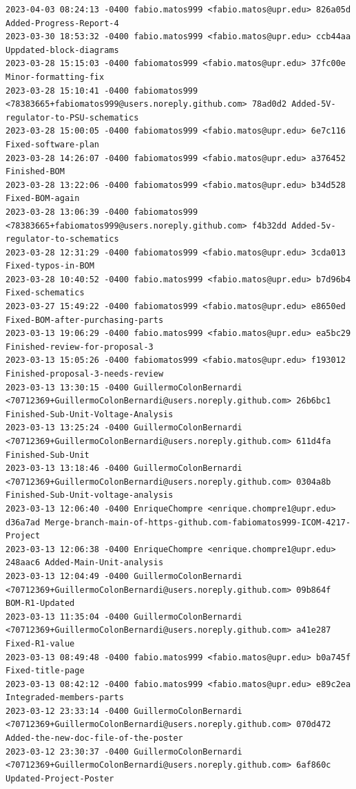\documentclass[12pt]{article}
\begin{document}
\begin{lstlisting}
2023-04-03 08:24:13 -0400 fabio.matos999 <fabio.matos@upr.edu> 826a05d Added-Progress-Report-4
2023-03-30 18:53:32 -0400 fabio.matos999 <fabio.matos@upr.edu> ccb44aa Uppdated-block-diagrams
2023-03-28 15:15:03 -0400 fabiomatos999 <fabio.matos@upr.edu> 37fc00e Minor-formatting-fix
2023-03-28 15:10:41 -0400 fabiomatos999 <78383665+fabiomatos999@users.noreply.github.com> 78ad0d2 Added-5V-regulator-to-PSU-schematics
2023-03-28 15:00:05 -0400 fabiomatos999 <fabio.matos@upr.edu> 6e7c116 Fixed-software-plan
2023-03-28 14:26:07 -0400 fabiomatos999 <fabio.matos@upr.edu> a376452 Finished-BOM
2023-03-28 13:22:06 -0400 fabiomatos999 <fabio.matos@upr.edu> b34d528 Fixed-BOM-again
2023-03-28 13:06:39 -0400 fabiomatos999 <78383665+fabiomatos999@users.noreply.github.com> f4b32dd Added-5v-regulator-to-schematics
2023-03-28 12:31:29 -0400 fabiomatos999 <fabio.matos@upr.edu> 3cda013 Fixed-typos-in-BOM
2023-03-28 10:40:52 -0400 fabio.matos999 <fabio.matos@upr.edu> b7d96b4 Fixed-schematics
2023-03-27 15:49:22 -0400 fabiomatos999 <fabio.matos@upr.edu> e8650ed Fixed-BOM-after-purchasing-parts
2023-03-13 19:06:29 -0400 fabio.matos999 <fabio.matos@upr.edu> ea5bc29 Finished-review-for-proposal-3
2023-03-13 15:05:26 -0400 fabiomatos999 <fabio.matos@upr.edu> f193012 Finished-proposal-3-needs-review
2023-03-13 13:30:15 -0400 GuillermoColonBernardi <70712369+GuillermoColonBernardi@users.noreply.github.com> 26b6bc1 Finished-Sub-Unit-Voltage-Analysis
2023-03-13 13:25:24 -0400 GuillermoColonBernardi <70712369+GuillermoColonBernardi@users.noreply.github.com> 611d4fa Finished-Sub-Unit
2023-03-13 13:18:46 -0400 GuillermoColonBernardi <70712369+GuillermoColonBernardi@users.noreply.github.com> 0304a8b Finished-Sub-Unit-voltage-analysis
2023-03-13 12:06:40 -0400 EnriqueChompre <enrique.chompre1@upr.edu> d36a7ad Merge-branch-main-of-https-github.com-fabiomatos999-ICOM-4217-Project
2023-03-13 12:06:38 -0400 EnriqueChompre <enrique.chompre1@upr.edu> 248aac6 Added-Main-Unit-analysis
2023-03-13 12:04:49 -0400 GuillermoColonBernardi <70712369+GuillermoColonBernardi@users.noreply.github.com> 09b864f BOM-R1-Updated
2023-03-13 11:35:04 -0400 GuillermoColonBernardi <70712369+GuillermoColonBernardi@users.noreply.github.com> a41e287 Fixed-R1-value
2023-03-13 08:49:48 -0400 fabio.matos999 <fabio.matos@upr.edu> b0a745f Fixed-title-page
2023-03-13 08:42:12 -0400 fabio.matos999 <fabio.matos@upr.edu> e89c2ea Integraded-members-parts
2023-03-12 23:33:14 -0400 GuillermoColonBernardi <70712369+GuillermoColonBernardi@users.noreply.github.com> 070d472 Added-the-new-doc-file-of-the-poster
2023-03-12 23:30:37 -0400 GuillermoColonBernardi <70712369+GuillermoColonBernardi@users.noreply.github.com> 6af860c Updated-Project-Poster

\end{lstlisting}
\end{document}
